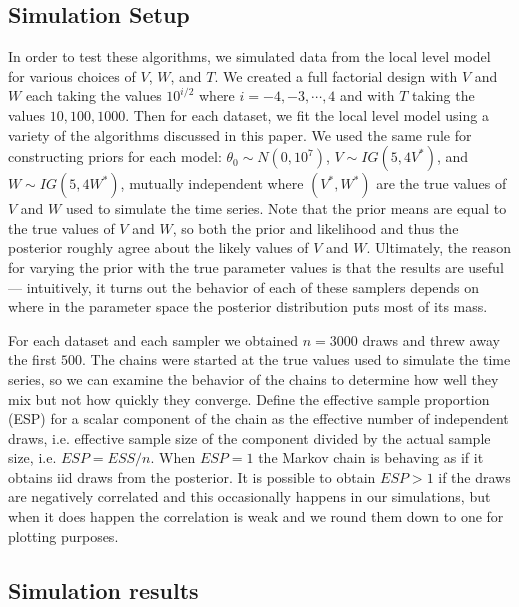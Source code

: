 \documentclass[12pt]{article}
\begin{document}
\subsection{Simulation Setup}

In order to test these algorithms, we simulated data from the local level model for various choices of $V$, $W$, and $T$. We created a full factorial design with $V$ and $W$ each taking the values $10^{i/2}$ where $i=-4,-3,\cdots,4$ and with $T$ taking the values $10, 100, 1000$. Then for each dataset, we fit the local level model using a variety of the algorithms discussed in this paper. We used the same rule for constructing priors for each model: $\theta_0\sim N(0,10^7)$, $V\sim IG(5, 4V^*)$, and $W\sim IG(5, 4W^*)$, mutually independent where $(V^*,W^*)$ are the true values of $V$ and $W$ used to simulate the time series. Note that the prior means are equal to the true values of $V$ and $W$, so both the prior and likelihood and thus the posterior roughly agree about the likely values of $V$ and $W$. Ultimately, the reason for varying the prior with the true parameter values is that the results are useful --- intuitively, it turns out the behavior of each of these samplers depends on where in the parameter space the posterior distribution puts most of its mass.

For each dataset and each sampler we obtained $n=3000$ draws and threw away the first $500$. The chains were started at the true values used to simulate the time series, so we can examine the behavior of the chains to determine how well they mix but not how quickly they converge. Define the effective sample proportion (ESP) for a scalar component of the chain as the effective number of independent draws, i.e. effective sample size \citep{gelman2013bayesian} of the component divided by the actual sample size, i.e. $ESP=ESS/n$. When $ESP=1$ the Markov chain is behaving as if it obtains iid draws from the posterior. It is possible to obtain $ESP>1$ if the draws are negatively correlated and this occasionally happens in our simulations, but when it does happen the correlation is weak and we round them down to one for plotting purposes.

\subsection{Simulation results}
\end{document}
